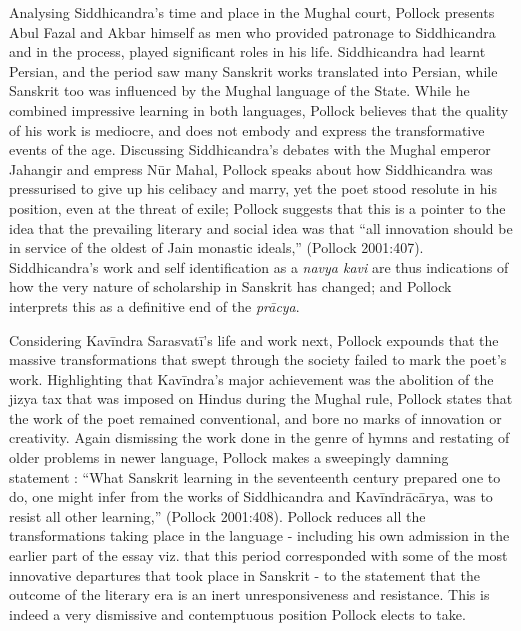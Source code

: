 Analysing Siddhicandra’s time and place in the Mughal court, Pollock presents Abul Fazal and Akbar himself as men who provided patronage to Siddhicandra and in the process, played significant roles in his life. Siddhicandra had learnt Persian, and the period saw many Sanskrit works translated into Persian, while Sanskrit too was influenced by the Mughal language of the State. While he combined impressive learning in both languages, Pollock believes that the quality of his work is mediocre, and does not embody and express the transformative events of the age. Discussing Siddhicandra’s debates with the Mughal emperor Jahangir and empress Nūr Mahal, Pollock speaks about how Siddhicandra was pressurised to give up his celibacy and marry, yet the poet stood resolute in his position, even at the threat of exile; Pollock suggests that this is a pointer to the idea that the prevailing literary and social idea was that “all innovation should be in service of the oldest of Jain monastic ideals,” (Pollock 2001:407). Siddhicandra’s work and self identification as a {\sl navya kavi} are thus indications of how the very nature of scholarship in Sanskrit has changed; and Pollock interprets this as a definitive end of the {\sl prācya}.

Considering Kavīndra Sarasvatī’s life and work next, Pollock expounds that the massive transformations that swept through the society failed to mark the poet’s work. Highlighting that Kavīndra’s major achievement was the abolition of the jizya tax that was imposed on Hindus during the Mughal rule, Pollock states that the work of the poet remained conventional, and bore no marks of innovation or creativity. Again dismissing the work done in the genre of hymns and restating of older problems in newer language, Pollock makes a sweepingly damning statement : “What Sanskrit learning in the seventeenth century prepared one to do, one might infer from the works of Siddhicandra and Kavīndrācārya, was to resist all other learning,” (Pollock 2001:408). Pollock reduces all the transformations taking place in the language - including his own admission in the earlier part of the essay viz. that this period corresponded with some of the most innovative departures that took place in Sanskrit - to the statement that the outcome of the literary era is an inert unresponsiveness and resistance. This is indeed a very dismissive and contemptuous position Pollock elects to take.

